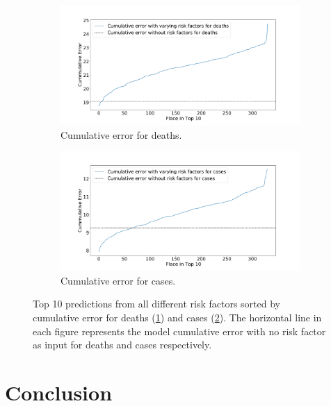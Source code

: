 \documentclass[a4paper, inpress]{jds} %
\renewcommand{\_}{%
    \textunderscore\hspace{0pt}%
}
\begin{document}
\begin{figure}[!htbp]
    \begin{subfigure}{.95\textwidth}
        \centering
        \includegraphics[width=1.0\textwidth]{images/PlaceTop10_DeathNEW3.pdf}
        \caption{Cumulative error for deaths.}
        \label{fig:place-top10-death}
    \end{subfigure}
    \begin{subfigure}{.95\textwidth}
        \centering
        \includegraphics[width=1.0\textwidth]{images/PlaceTop10_CasesNEW3.pdf}
        \caption{Cumulative error for cases.}
        \label{fig:place-top10-cases}
    \end{subfigure}

    \caption{Top 10 predictions from all different risk factors sorted by cumulative error for deaths (\ref{fig:place-top10-death}) and cases (\ref{fig:place-top10-cases}). The horizontal line in each figure represents the model cumulative error with no risk factor as input for deaths and cases respectively.}
    \label{fig:place-top10-both}
    
    
\end{figure}

\section{Conclusion}
\end{document}
